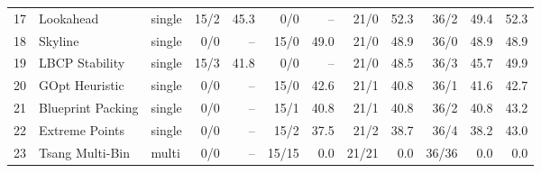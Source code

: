\begin{table}[htbp]
\begin{tabular}{rllrrrrrrrrr}
17 & Lookahead & single & 15/2 & 45.3 & 0/0 & -- & 21/0 & 52.3 & 36/2 & 49.4 & 52.3 \\
18 & Skyline & single & 0/0 & -- & 15/0 & 49.0 & 21/0 & 48.9 & 36/0 & 48.9 & 48.9 \\
19 & LBCP Stability & single & 15/3 & 41.8 & 0/0 & -- & 21/0 & 48.5 & 36/3 & 45.7 & 49.9 \\
20 & GOpt Heuristic & single & 0/0 & -- & 15/0 & 42.6 & 21/1 & 40.8 & 36/1 & 41.6 & 42.7 \\
21 & Blueprint Packing & single & 0/0 & -- & 15/1 & 40.8 & 21/1 & 40.8 & 36/2 & 40.8 & 43.2 \\
22 & Extreme Points & single & 0/0 & -- & 15/2 & 37.5 & 21/2 & 38.7 & 36/4 & 38.2 & 43.0 \\
23 & Tsang Multi-Bin & multi & 0/0 & -- & 15/15 & 0.0 & 21/21 & 0.0 & 36/36 & 0.0 & 0.0 \\
\bottomrule
\end{tabular}
\end{table}